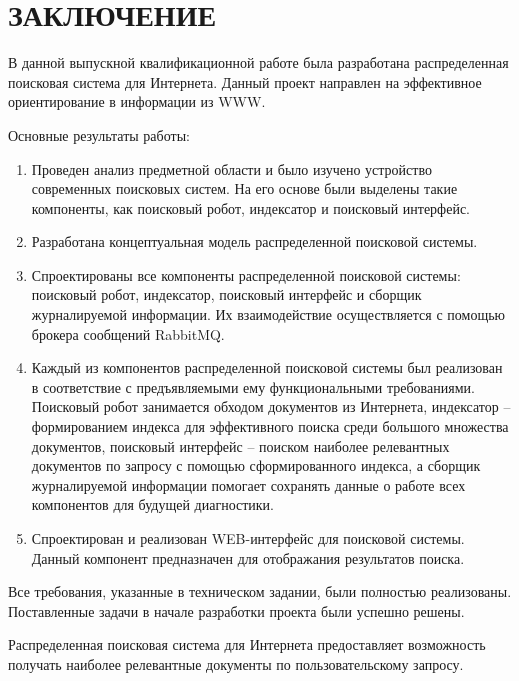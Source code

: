 \section*{ЗАКЛЮЧЕНИЕ}

В данной выпускной квалификационной работе была разработана распределенная поисковая система для Интернета. Данный проект направлен на эффективное ориентирование в информации из WWW.

Основные результаты работы:

\begin{enumerate}
	\item Проведен анализ предметной области и было изучено устройство современных поисковых систем. На его основе были выделены такие компоненты, как поисковый робот, индексатор и поисковый интерфейс.
	\item Разработана концептуальная модель распределенной поисковой системы.
	\item Спроектированы все компоненты распределенной поисковой системы: поисковый робот, индексатор, поисковый интерфейс и сборщик журналируемой информации. Их взаимодействие осуществляется с помощью брокера сообщений RabbitMQ.
	\item Каждый из компонентов распределенной поисковой системы был реализован в соответствие с предъявляемыми ему функциональными требованиями. Поисковый робот занимается обходом документов из Интернета, индексатор -- формированием индекса для эффективного поиска среди большого множества документов, поисковый интерфейс -- поиском наиболее релевантных документов по запросу с помощью сформированного индекса, а сборщик журналируемой информации помогает сохранять данные о работе всех компонентов для будущей диагностики. 
	\item Спроектирован и реализован WEB-интерфейс для поисковой системы. Данный компонент предназначен для отображания результатов поиска. 
\end{enumerate}

Все требования, указанные в техническом задании, были полностью реализованы. Поставленные задачи в начале разработки проекта были успешно решены.

Распределенная поисковая система для Интернета предоставляет возможность получать наиболее релевантные документы по пользовательскому запросу.
